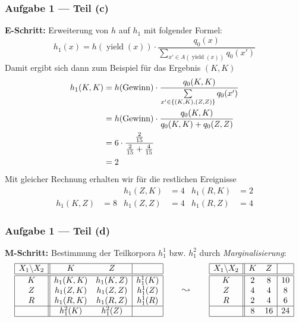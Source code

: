 \documentclass{beamer}
\DeclareMathOperator{\yield}{yield}
\DeclareMathOperator{\win}{Gewinn}
\begin{document}
\begin{frame} \frametitle{Aufgabe 1 --- Teil (c)}
	\justifying \footnotesize
	\textbf{E-Schritt:} Erweiterung von $h$ auf $h_1$ mit folgender Formel:
	\begin{equation*}
		h_1(x) = h(\yield(x)) \cdot \frac{q_0(x)}{\sum\limits_{x' \in A(\yield(x))} q_0(x')}
	\end{equation*}
	\pause
	Damit ergibt sich dann zum Beispiel für das Ergebnis $(K,K)$
	\begin{align*}
		h_1(K,K) &= h(\win) \cdot \frac{q_0(K,K)}{\sum\limits_{x' \in \menge{(K,K),(Z,Z)}} q_0(x')} \\
		&= h(\win) \cdot \frac{q_0(K,K)}{q_0(K,K) + q_0(Z,Z)} \\
		&= 6 \cdot \frac{\frac{2}{15}}{\frac{2}{15} + \frac{4}{15}} \\
		&= 2
	\end{align*}
	\pause
	Mit gleicher Rechnung erhalten wir für die restlichen Ereignisse
	\begin{align*}
		 && h_1(Z,K) &= 4 & h_1(R,K) &= 2 \\
		h_1(K,Z) &= 8 & h_1(Z,Z) &= 4 & h_1(R,Z) &= 4
	\end{align*}
\end{frame}

\begin{frame} \frametitle{Aufgabe 1 --- Teil (d)}
	\justifying \footnotesize
	\textbf{M-Schritt:} Bestimmung der Teilkorpora $h_1^1$ bzw. $h_1^2$ durch \textit{Marginalisierung}:
	\pause
	\begin{equation*}
		\begin{array}{|c||cc|c|}
		\hline
		X_1 \backslash X_2 & K & Z & \\ \hline \hline
		K & h_1(K,K) & h_1(K,Z) & h_1^1(K) \\
		Z & h_1(Z,K) & h_1(Z,Z) & h_1^1(Z) \\
		R & h_1(R,K) & h_1(R,Z) & h_1^1(R) \\ \hline
		& h_1^2(K) & h_1^2(Z) & \\ \hline
		\end{array}
		\qquad \leadsto \qquad 
		\begin{array}{|c||cc|c|}
		\hline
		X_1 \backslash X_2 & K & Z & \\ \hline \hline
		K & 2 &  8 & 10 \\
		Z & 4 &  4 &  8 \\
		R & 2 &  4 &  6 \\ \hline
		& 8 & 16 & 24 \\ \hline
		\end{array}
	\end{equation*}
\end{frame}
\end{document}
